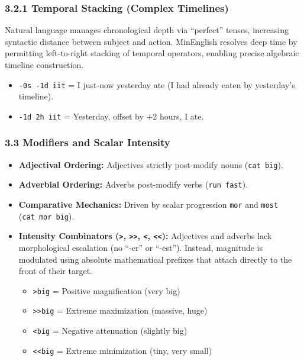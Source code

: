 \subsubsection{3.2.1 Temporal Stacking (Complex
Timelines)}\label{temporal-stacking-complex-timelines}

Natural language manages chronological depth via ``perfect'' tenses,
increasing syntactic distance between subject and action. MinEnglish
resolves deep time by permitting left-to-right stacking of temporal
operators, enabling precise algebraic timeline construction.

\begin{itemize}
\tightlist
\item
  \texttt{-0s\ -1d\ iit} = I just-now yesterday ate (I had already eaten
  by yesterday's timeline).
\item
  \texttt{-1d\ 2h\ iit} = Yesterday, offset by +2 hours, I ate.
\end{itemize}

\subsubsection{3.3 Modifiers and Scalar
Intensity}\label{modifiers-and-scalar-intensity}

\begin{itemize}
\tightlist
\item
  \textbf{Adjectival Ordering:} Adjectives strictly post-modify nouns
  (\texttt{cat\ big}).
\item
  \textbf{Adverbial Ordering:} Adverbs post-modify verbs
  (\texttt{run\ fast}).
\item
  \textbf{Comparative Mechanics:} Driven by scalar progression
  \texttt{mor} and \texttt{most} (\texttt{cat\ mor\ big}).
\item
  \textbf{Intensity Combinators (\texttt{\textgreater{}},
  \texttt{\textgreater{}\textgreater{}}, \texttt{\textless{}},
  \texttt{\textless{}\textless{}}):} Adjectives and adverbs lack
  morphological escalation (no ``-er'' or ``-est''). Instead, magnitude
  is modulated using absolute mathematical prefixes that attach directly
  to the front of their target.

  \begin{itemize}
  \tightlist
  \item
    \texttt{\textgreater{}big} = Positive magnification (very big)
  \item
    \texttt{\textgreater{}\textgreater{}big} = Extreme maximization
    (massive, huge)
  \item
    \texttt{\textless{}big} = Negative attenuation (slightly big)
  \item
    \texttt{\textless{}\textless{}big} = Extreme minimization (tiny,
    very small)
  \end{itemize}
\end{itemize}

